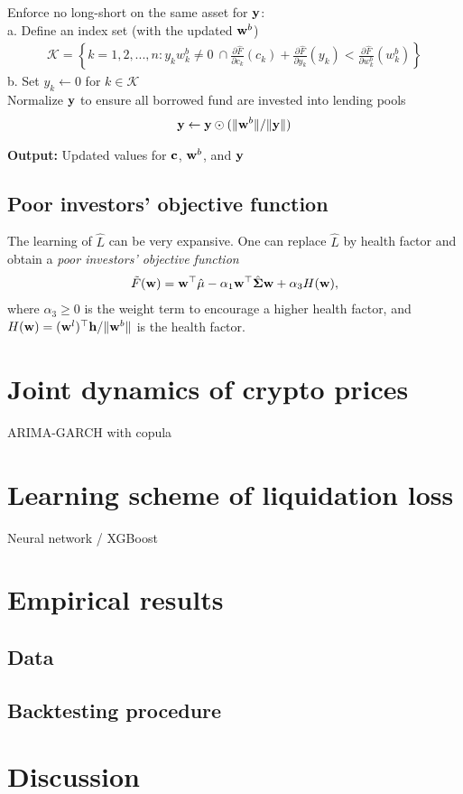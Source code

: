\documentclass{article} %
\newcommand{\INDSTATE}[1][1]{\hspace{#1\algorithmicindent}}
\theoremstyle{plain}
\theoremstyle{definition} %
\begin{document}
\begin{algorithm}[th]
\begin{algorithmic}[1]
    \STATE Enforce no long-short on the same asset for ${\bf y}$:\\
    \INDSTATE a. Define an index set (with the updated ${\bf w}^b$)
    \begin{align*} 
      \mathcal{K} = \left\{
        k=1,2,...,n: y_k w^b_k\neq 0\ \cap 
      \frac{\partial \hat F}{\partial c_k}(c_k) + \frac{\partial \hat F}{\partial y_k}(y_k) < \frac{\partial \hat F}{\partial w^b_k}(w^b_k)
      \right\}
    \end{align*}
    \INDSTATE b. Set $y_k \leftarrow 0$ for $k \in \mathcal{K}$\\
    
    \STATE Normalize ${\bf y}$ to ensure all borrowed fund are invested into lending pools
     \begin{align*}{\bf y} \leftarrow {\bf y} \odot (\|{\bf w}^b\|/ \|{\bf y}\|)\end{align*}
    
    \STATE \textbf{Output:} Updated values for ${\bf c}$, ${\bf w}^b$, and ${\bf y}$
    \end{algorithmic}
  \end{algorithm}


\subsection{Poor investors' objective function}
The learning of $\hat L$ can be very expansive. 
 One can replace $\hat L$ by health factor and obtain a \textit{poor investors' objective function}
 \begin{align}
  \tilde F({\bf w}) = {\bf w}^\top \hat {\bf \mu} - \alpha_1 {\bf w}^\top \hat {\bf \Sigma}{\bf w} + \alpha_3 H({\bf w}),
 \end{align}
 where $\alpha_3 \geq 0$ is the weight term to encourage a higher health factor, and $H({\bf w}) = ({\bf w}^l)^\top{\bf h}/\|{\bf w}^b\|$ is the health factor. 

\section{Joint dynamics of crypto prices}
ARIMA-GARCH with copula

\section{Learning scheme of liquidation loss}\label{sec:ML}
Neural network / XGBoost

\section{Empirical results}
\subsection{Data}
\subsection{Backtesting procedure}

\section{Discussion}

\end{document}
